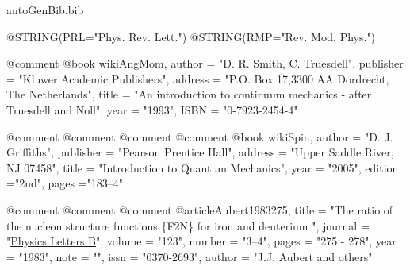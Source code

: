 \begin{filecontents*}{autoGenBib.bib} 

@STRING(PRL="Phys. Rev. Lett.")
@STRING(RMP="Rev. Mod. Phys.")

@comment %
@book{ wikiAngMom,
	author = "{D. R. Smith, C. Truesdell}",
	publisher = "Kluwer Academic Publishers",
	address = "P.O. Box 17,3300 AA Dordrecht, The Netherlands",
	title = "An introduction to continuum mechanics - after Truesdell and Noll",
	year = "1993",
	ISBN = "0-7923-2454-4"
}

@comment %
@comment %
@comment %
@comment %
@book{ wikiSpin,
	author = "D. J. Griffiths",
	publisher = "Pearson Prentice Hall",
	address = "Upper Saddle River, NJ 07458",
	title = "Introduction to Quantum Mechanics",
	year = "2005",
	edition ="2nd",
	pages ="183--4"
}

@comment %
@comment %
@comment %
@article{Aubert1983275,
title = "The ratio of the nucleon structure functions \{F2N\} for iron and deuterium ",
journal = "\href{http://www.sciencedirect.com/science/article/pii/0370269383904379}{Physics Letters B}",
volume = "123",
number = "3–4",
pages = "275 - 278",
year = "1983",
note = "",
issn = "0370-2693",
author = "J.J. Aubert and others"
}


\end{filecontents*}
